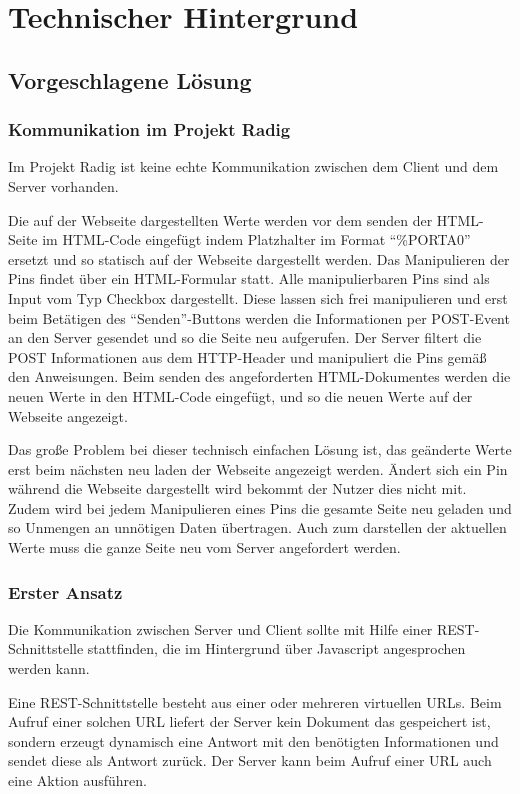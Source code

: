 \chapter{Technischer Hintergrund}

\section{Vorgeschlagene Lösung}

\subsection{Kommunikation im Projekt Radig}
Im Projekt Radig ist keine echte Kommunikation zwischen dem Client und dem Server
vorhanden.

Die auf der Webseite dargestellten Werte werden vor dem senden der HTML-Seite
im HTML-Code eingefügt indem Platzhalter im Format "`\%PORTA0"' ersetzt und so statisch auf
der Webseite dargestellt werden. Das Manipulieren der Pins findet über ein HTML-Formular
statt. Alle manipulierbaren Pins sind als Input vom Typ Checkbox dargestellt. Diese lassen
sich frei manipulieren und erst beim Betätigen des "`Senden"'-Buttons werden die
Informationen per POST-Event an den Server gesendet und so die Seite neu aufgerufen. Der
Server filtert die POST Informationen aus dem HTTP-Header und manipuliert die Pins gemäß
den Anweisungen. Beim senden des angeforderten HTML-Dokumentes werden die neuen Werte in
den HTML-Code eingefügt, und so die neuen Werte auf der Webseite angezeigt.

Das große Problem bei dieser technisch einfachen Lösung ist, das geänderte Werte erst beim
nächsten neu laden der Webseite angezeigt werden. Ändert sich ein Pin während die Webseite
dargestellt wird bekommt der Nutzer dies nicht mit. Zudem wird bei jedem Manipulieren
eines Pins die gesamte Seite neu geladen und so Unmengen an unnötigen Daten übertragen.
Auch zum darstellen der aktuellen Werte muss die ganze Seite neu vom Server angefordert
werden.

\subsection{Erster Ansatz}
Die Kommunikation zwischen Server und Client sollte mit Hilfe einer REST-Schnittstelle
stattfinden, die im Hintergrund über Javascript angesprochen werden kann.

Eine REST-Schnittstelle besteht aus einer oder mehreren virtuellen URLs. Beim Aufruf einer
solchen URL liefert der Server kein Dokument das gespeichert ist, sondern erzeugt
dynamisch eine Antwort mit den benötigten Informationen und sendet diese als Antwort
zurück. Der Server kann beim Aufruf einer URL auch eine Aktion ausführen.

